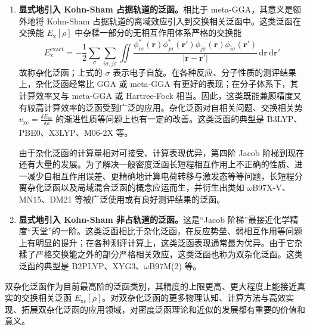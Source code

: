 \begin{enumerate}[nosep]
  \item \textbf{显式地引入 Kohn-Sham 占据轨道的泛函。}相比于 meta-GGA，其意义是额外地将 Kohn-Sham 占据轨道的离域效应引入到交换相关泛函中。这类泛函在交换能 $E_\mathrm{x} [\rho]$ 中杂糅一部分的无相互作用体系严格的交换能
  \begin{equation}
    E_\mathrm{x}^\mathrm{exact} = - \frac{1}{2} \sum_\sigma \sum_{i\sigma, j\sigma} \iint \frac{\phi_{i\sigma}^* (\bm{r}) \phi_{j\sigma}^* (\bm{r}') \phi_{j\sigma} (\bm{r}) \phi_{i\sigma} (\bm{r}')}{|\bm{r} - \bm{r}'|} \, \mathrm{d} \bm{r} \, \mathrm{d} \bm{r}'
  \end{equation}
  故称杂化泛函；上式的 $\sigma$ 表示电子自旋。在各种反应、分子性质的测评结果上，杂化泛函经常比 GGA 或 meta-GGA 有更好的表现；在分子体系下，其计算效率又与 meta-GGA 或 Hartree-Fock 相当。因此，这类既能兼顾精度又有较高计算效率的泛函受到广泛的应用。杂化泛函对自相关问题、交换相关势 $v_\mathrm{xc} = \frac{\delta E_\mathrm{xc}}{\delta \rho}$ 的渐进性质等问题上也有一定的改善。这类泛函的典型是 B3LYP\cite{Becke-Becke.JCP.1993, Stephens-Frisch.JPC.1994}、PBE0\cite{Adamo-Barone.JCP.1999, Ernzerhof-Scuseria.JCP.1999}、X3LYP\cite{Xu-Goddard.PNAS.2004}、M06-2X\cite{Zhao-Truhlar.TCA.2008} 等。
  
  由于杂化泛函的计算量相对可接受、计算表现优异，第四阶 Jacob 阶梯到现在还有大量的发展。为了解决一般密度泛函长短程相互作用上不正确的性质、进一减少自相互作用误差、更精确地计算电荷转移与激发态等等问题，长短程分离杂化泛函\cite{Iikura-Hirao.JCP.2001}以及局域混合泛函\cite{Jaramillo-Ernzerhof.JCP.2003}的概念应运而生，并衍生出类如 $\omega$B97X-V\cite{Mardirossian-Head-Gordon.PCCP.2014}、MN15\cite{Yu-Truhlar.CS.2016}、DM21\cite{Kirkpatrick-Cohen.S.2021} 等被广泛使用或有良好测评结果的泛函。

  \item \textbf{显式地引入 Kohn-Sham 非占轨道的泛函。}这是“Jacob 阶梯”最接近化学精度“天堂”的一阶。这类泛函相比于杂化泛函，在反应势垒、弱相互作用等问题上有明显的提升；在各种测评计算上，这类泛函表现通常最为优异。由于它杂糅了严格交换能之外的部分严格相关效应，这类泛函也称为双杂化泛函。这类泛函的典型是 B2PLYP\cite{Grimme-Grimme.JCP.2006}、XYG3\cite{Zhang-Goddard.PNAS.2009}、$\omega$B97M(2)\cite{Mardirossian-Head-Gordon.JCP.2018} 等。
\end{enumerate}

双杂化泛函作为目前最高阶的泛函类别，其精度的上限更高、更大程度上能接近真实的交换相关泛函 $E_\mathrm{xc}[\rho]$。对双杂化泛函的更多物理认知、计算方法与高效实现、拓展双杂化泛函的应用领域，对密度泛函理论和近似的发展都有重要的价值和意义。

